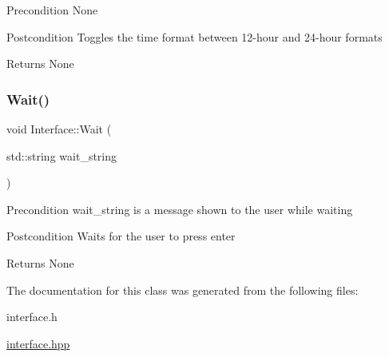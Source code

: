 \begin{DoxyPrecond}{Precondition}
None 
\end{DoxyPrecond}
\begin{DoxyPostcond}{Postcondition}
Toggles the time format between 12-\/hour and 24-\/hour formats 
\end{DoxyPostcond}
\begin{DoxyReturn}{Returns}
None 
\end{DoxyReturn}
\mbox{\label{class_interface_ab235ba2f0184e3fbfd5d5a64d5eb85ef}} 
\subsubsection{\texorpdfstring{Wait()}{Wait()}}
{\footnotesize\ttfamily void Interface\+::\+Wait (\begin{DoxyParamCaption}\item[{std\+::string}]{wait\+\_\+string }\end{DoxyParamCaption})\hspace{0.3cm}{\ttfamily [static]}}

\begin{DoxyPrecond}{Precondition}
wait\+\_\+string is a message shown to the user while waiting 
\end{DoxyPrecond}
\begin{DoxyPostcond}{Postcondition}
Waits for the user to press enter 
\end{DoxyPostcond}
\begin{DoxyReturn}{Returns}
None 
\end{DoxyReturn}


The documentation for this class was generated from the following files\+:\begin{DoxyCompactItemize}
\item 
interface.\+h\item 
\mbox{\hyperlink{interface_8hpp}{interface.\+hpp}}\end{DoxyCompactItemize}
